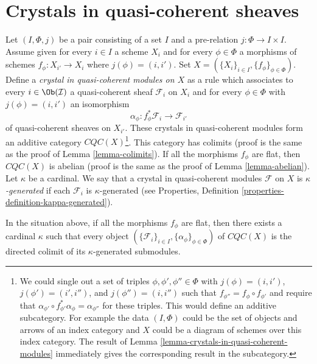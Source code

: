 \section{Crystals in quasi-coherent sheaves}
\label{section-crystals}

\noindent
Let $(I, \Phi, j)$ be a pair consisting of a set $I$
and a pre-relation $j : \Phi \to I \times I$. Assume given for every
$i \in I$ a scheme $X_i$ and for every $\phi \in \Phi$
a morphisms of schemes $f_\phi : X_{i'} \to X_i$ where
$j(\phi) = (i, i')$. Set
$X = (\{X_i\}_{i \in I}, \{f_\phi\}_{\phi \in \Phi})$.
Define a {\it crystal in quasi-coherent modules on $X$}
as a rule which associates to every
$i \in \Ob(\mathcal{I})$ a quasi-coherent sheaf $\mathcal{F}_i$ on $X_i$
and for every $\phi \in \Phi$ with $j(\phi) = (i, i')$ an isomorphism
$$
\alpha_\phi : f_\phi^*\mathcal{F}_i \longrightarrow \mathcal{F}_{i'}
$$
of quasi-coherent sheaves on $X_{i'}$. These crystals in quasi-coherent
modules form an additive category $\textit{CQC}(X)$\footnote{We could single
out a set of triples $\phi, \phi', \phi'' \in \Phi$ with
$j(\phi) = (i, i')$, $j(\phi') = (i', i'')$, and $j(\phi'') = (i, i'')$
such that $f_{\phi''} = f_\phi \circ f_{\phi'}$ and require that
$\alpha_{\phi'} \circ f_{\phi'}^*\alpha_\phi = \alpha_{\phi''}$
for these triples. This would define an additive subcategory.
For example the data $(I, \Phi)$ could be the set of objects and
arrows of an index category and $X$ could be a diagram of schemes over
this index category. The result of
Lemma \ref{lemma-crystals-in-quasi-coherent-modules}
immediately gives the corresponding result in the subcategory.}.
This category has colimits
(proof is the same as the proof of Lemma \ref{lemma-colimits}).
If all the morphisms $f_\phi$ are flat, then $\textit{CQC}(X)$ is
abelian (proof is the same as the proof of Lemma \ref{lemma-abelian}).
Let $\kappa$ be a cardinal. We say that a crystal in quasi-coherent modules
$\mathcal{F}$ on $X$ is {\it $\kappa$-generated} if each $\mathcal{F}_i$ is
$\kappa$-generated (see
Properties, Definition \ref{properties-definition-kappa-generated}).

\begin{lemma}
\label{lemma-crystals-in-quasi-coherent-modules}
In the situation above, if all the morphisms $f_\phi$ are flat, then there
exists a cardinal $\kappa$ such that every object
$(\{\mathcal{F}_i\}_{i \in I}, \{\alpha_\phi\}_{\phi \in \Phi})$
of $\textit{CQC}(X)$ is the directed colimit of its
$\kappa$-generated submodules.
\end{lemma}


